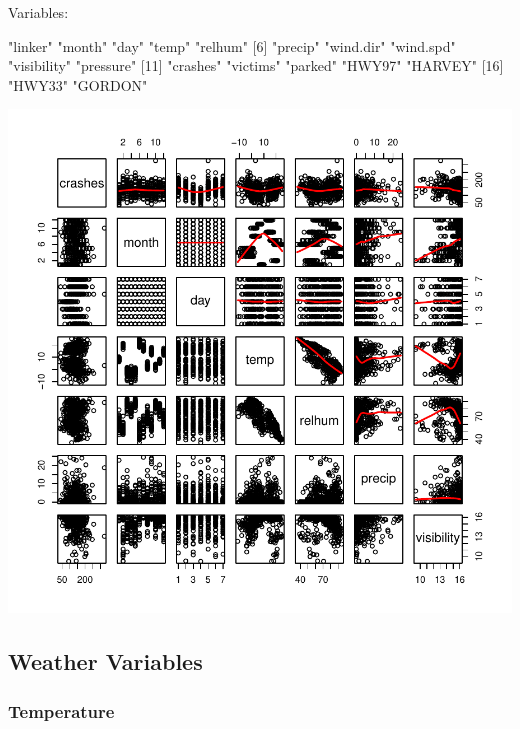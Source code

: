 \documentclass[11pt, a4paper]{article}
\begin{document}
\begin{Schunk}
\begin{Soutput}
Variables:
\end{Soutput}
\begin{Soutput}
 [1] "linker"     "month"      "day"        "temp"       "relhum"    
 [6] "precip"     "wind.dir"   "wind.spd"   "visibility" "pressure"  
[11] "crashes"    "victims"    "parked"     "HWY97"      "HARVEY"    
[16] "HWY33"      "GORDON"    
\end{Soutput}
\end{Schunk}
\includegraphics{variableinvestigation-034}



\pagebreak
\subsection{Weather Variables}

\subsubsection{Temperature}
\end{document}
